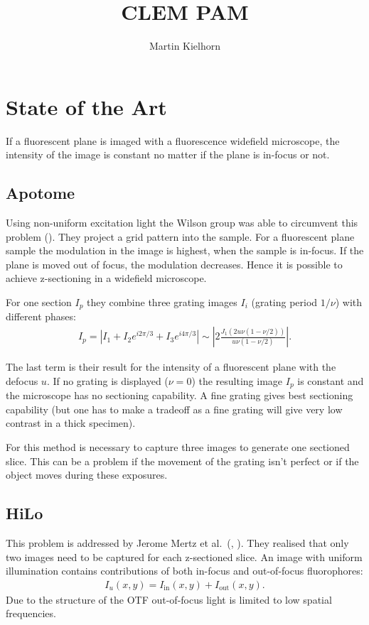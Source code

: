 \documentclass[11pt,abstracton,titlepage]{scrartcl}
\title{CLEM PAM}
\author{Martin Kielhorn}
\newcommand{\abs}[1]{\left| #1 \right|}
\begin{document}
\section{State of the Art}
If a fluorescent plane is imaged with a fluorescence widefield
microscope, the intensity of the image is constant no matter if the
plane is in-focus or not. 
\subsection{Apotome}
Using non-uniform excitation light the Wilson group was able to
circumvent this problem (\cite{1997Neil}). They project a grid pattern
into the sample. For a fluorescent plane sample the modulation in the
image is highest, when the sample is in-focus. If the plane is moved
out of focus, the modulation decreases. Hence it is possible to achieve
z-sectioning in a widefield microscope.

For one section $I_p$ they combine three grating images $I_i$ (grating
period $1/\nu$) with different phases:
\begin{align}
  I_p=\abs{I_1+I_2e^{i2\pi/3}+I_3e^{i4\pi/3}}
  \sim\abs{ 2 \frac{J_1(2u\nu(1-\nu/2))}{u\nu(1-\nu/2)}}.
\end{align}

The last term is their result for the intensity of a fluorescent plane
with the defocus $u$. If no grating is displayed ($\nu=0$) the
resulting image $I_p$ is constant and the microscope has no sectioning
capability. A fine grating gives best sectioning capability (but one
has to make a tradeoff as a fine grating will give very low contrast
in a thick specimen).

For this method is necessary to capture three images to generate one
sectioned slice. This can be a problem if the movement of the grating
isn't perfect or if the object moves during these exposures.

\subsection{HiLo}
This problem is addressed by Jerome Mertz et al.\ (\cite{2008Lim},
\cite{2009Santos}). They realised that only two images need to be
captured for each z-sectioned slice.
An image with uniform illumination contains contributions
of both in-focus and out-of-focus fluorophores:
\begin{align}
  I_u(x,y)=I_\textrm{in}(x,y)+I_\textrm{out}(x,y).
\end{align}
Due to the structure of the OTF out-of-focus light is limited to low
spatial frequencies.
\end{document}
